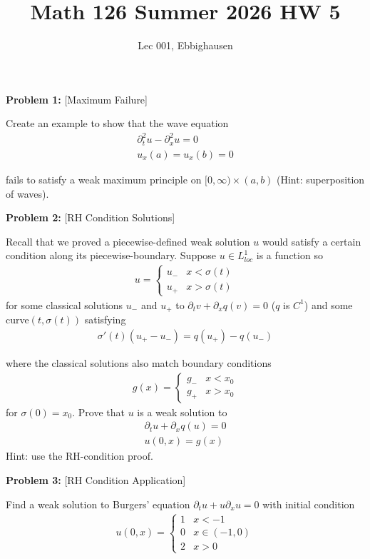 \documentclass{article}
\title{Math 126 Summer 2026 HW 5}
\author{Lec 001, Ebbighausen}
\newcommand{\pd}{\partial}
\begin{document}
	\pagestyle{fancy}
	\fancyfoot{} 
	
	\maketitle
	
	\textbf{Problem 1:} [Maximum Failure]
	
	Create an example to show that the wave equation 
	\begin{align*}
		\pd_{t}^{2}u - \pd_{x}^{2}u = 0 \\
		u_x(a) = u_x(b) = 0
	\end{align*}
	
	fails to satisfy a weak maximum principle on $[0,\infty) \times (a,b)$ (Hint: superposition of waves).
	
	
	\textbf{Problem 2:} [RH Condition Solutions]
	
	Recall that we proved a piecewise-defined weak solution $u$ would satisfy a certain condition along its piecewise-boundary. Suppose $u \in L^{1}_{loc}$ is a function so 
	\begin{align*}
		u = \begin{cases}
			u_{-} & x < \sigma(t) \\ u_+ & x > \sigma(t)
		\end{cases}
	\end{align*}
	for some classical solutions $u_-$ and $u_+$ to $\pd_{t}v + \pd_{x} q(v) = 0$ ($q$ is $C^1$) and some curve$(t,\sigma(t))$ satisfying 
	\begin{align*}
		\sigma'(t)(u_+ - u_-) = q(u_+) - q(u_-) 
	\end{align*}
	
	where the classical solutions also match boundary conditions 
	\begin{align*}
		g(x) = \begin{cases}
			g_- & x<x_0 \\ g_+ & x>x_0
		\end{cases}
	\end{align*}
	for $\sigma(0) = x_0$. Prove that $u$ is a weak solution to 
	\begin{align*}
		\pd_{t} u + \pd_{x}q(u) = 0 \\
		u(0,x) = g(x)
	\end{align*}
	Hint: use the RH-condition proof. 
	
	\textbf{Problem 3:} [RH Condition Application]
	
	Find a weak solution to Burgers' equation $\pd_{t} u + u \pd_{x}u=0$ with initial condition 
	\begin{align*}
		u(0,x) = \begin{cases}
			1 & x < -1 \\
			0 & x \in (-1,0) \\
			2 & x>0
		\end{cases}
	\end{align*}
	
\end{document}

